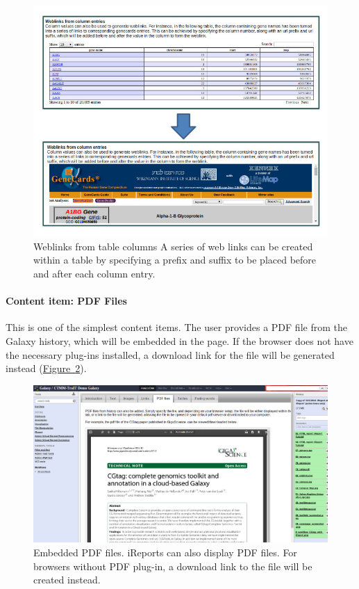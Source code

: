 \begin{figure}[h!]
    \includegraphics[width=\textwidth]{chapters/images/iReport/Hiltemann_columnlinks.jpg}
    \caption{Weblinks from table columns
   A series of web links can be created within a table by specifying a prefix and suffix to be placed before and after each column entry.}
    \label{fig:collinks}
\end{figure}

\paragraph*{Content item: PDF Files}
This is one of the simplest content items. The user provides a PDF file from the Galaxy history, which will be embedded in the page. If the browser does not have the necessary plug-ins installed, a download link for the file will be generated instead (\hyperref[fig:pdfexample]{Figure~\ref*{fig:pdfexample}}).

\begin{figure}[h!]
    \includegraphics[width=\textwidth]{chapters/images/iReport/Hiltemann_PDF.jpg}
    \caption{Embedded PDF files. iReports can also display PDF files. For browsers without PDF plug-in, a download link to the file will be created instead. }
    \label{fig:pdfexample}
\end{figure}

